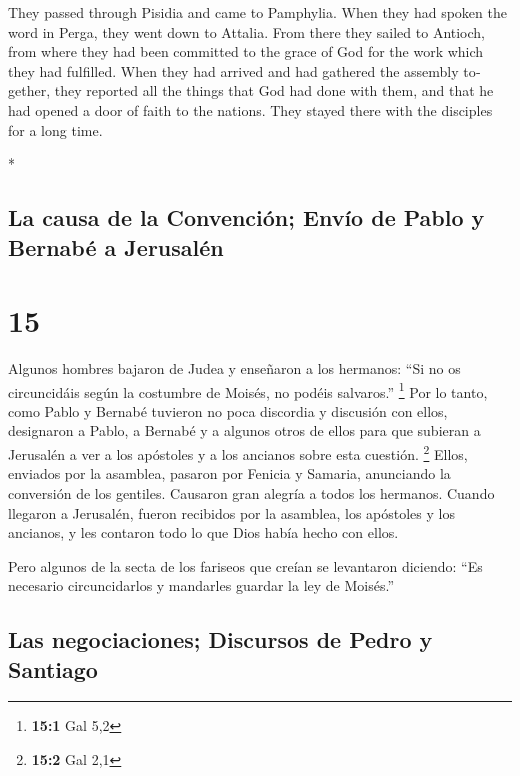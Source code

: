 \begin{paracol}{2}
\begin{otherlanguage}{english}
 They passed through Pisidia and came to Pamphylia.
 When they had spoken the word in Perga, they went down
to Attalia.  From there they sailed to Antioch, from
where they had been committed to the grace of God for the work which
they had fulfilled.  When they had arrived and had
gathered the assembly together, they reported all the things that God
had done with them, and that he had opened a door of faith to the
nations.  They stayed there with the disciples for a long
time.

\end{otherlanguage}

\switchcolumn[0]*

\hypertarget{la-causa-de-la-convenciuxf3n-envuxedo-de-pablo-y-bernabuxe9-a-jerusaluxe9n}{%
\subsection{La causa de la Convención; Envío de Pablo y Bernabé a
Jerusalén}\label{la-causa-de-la-convenciuxf3n-envuxedo-de-pablo-y-bernabuxe9-a-jerusaluxe9n}}

\hypertarget{section-28}{%
\section{15}\label{section-28}}

 Algunos hombres bajaron de Judea y enseñaron a los
hermanos: ``Si no os circuncidáis según la costumbre de Moisés, no
podéis salvaros.'' \footnote{\textbf{15:1} Gal 5,2}  Por
lo tanto, como Pablo y Bernabé tuvieron no poca discordia y discusión
con ellos, designaron a Pablo, a Bernabé y a algunos otros de ellos para
que subieran a Jerusalén a ver a los apóstoles y a los ancianos sobre
esta cuestión. \footnote{\textbf{15:2} Gal 2,1}  Ellos,
enviados por la asamblea, pasaron por Fenicia y Samaria, anunciando la
conversión de los gentiles. Causaron gran alegría a todos los hermanos.
 Cuando llegaron a Jerusalén, fueron recibidos por la
asamblea, los apóstoles y los ancianos, y les contaron todo lo que Dios
había hecho con ellos.

 Pero algunos de la secta de los fariseos que creían se
levantaron diciendo: ``Es necesario circuncidarlos y mandarles guardar
la ley de Moisés.''

\hypertarget{las-negociaciones-discursos-de-pedro-y-santiago}{%
\subsection{Las negociaciones; Discursos de Pedro y
Santiago}\label{las-negociaciones-discursos-de-pedro-y-santiago}}


\end{paracol}
